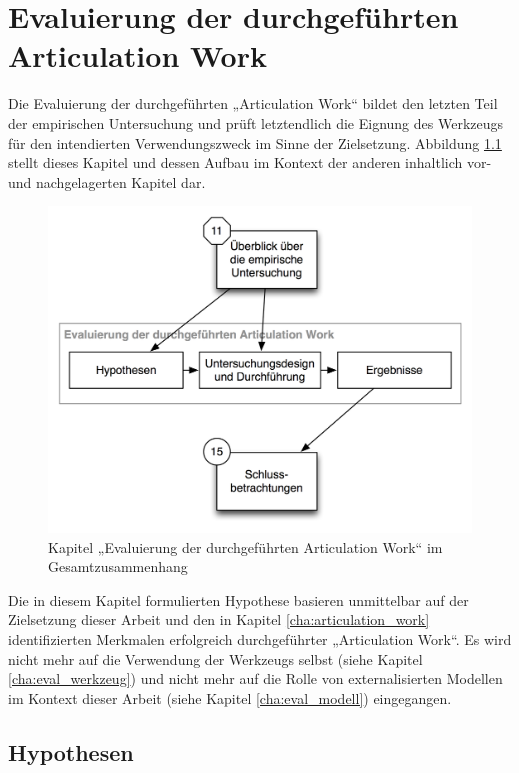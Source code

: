 \chapter{Evaluierung der durchgeführten Articulation Work} %
\label{cha:eval_aw}

Die Evaluierung der durchgeführten „Articulation Work“ bildet den letzten Teil der empirischen Untersuchung und prüft letztendlich die Eignung des Werkzeugs für den intendierten Verwendungszweck im Sinne der Zielsetzung. Abbildung \ref{fig:img_Kontextgrafiken_k14} stellt dieses Kapitel und dessen Aufbau im Kontext der anderen inhaltlich vor- und nachgelagerten Kapitel dar.


\begin{figure}[htbp]
	\centering
		\includegraphics[scale=0.6]{img/Kontextgrafiken/k14.png}
	\caption{Kapitel „Evaluierung der durchgeführten Articulation Work“ im Gesamtzusammenhang}
	\label{fig:img_Kontextgrafiken_k14}
\end{figure}


Die in diesem Kapitel formulierten Hypothese basieren unmittelbar auf der Zielsetzung dieser Arbeit und den in Kapitel \ref{cha:articulation_work} identifizierten Merkmalen erfolgreich durchgeführter „Articulation Work“. Es wird nicht mehr auf die Verwendung der Werkzeugs selbst (siehe Kapitel \ref{cha:eval_werkzeug}) und nicht mehr auf die Rolle von externalisierten Modellen im Kontext dieser Arbeit (siehe Kapitel \ref{cha:eval_modell}) eingegangen.

\section{Hypothesen} %
\label{sec:a_hypothesen}

